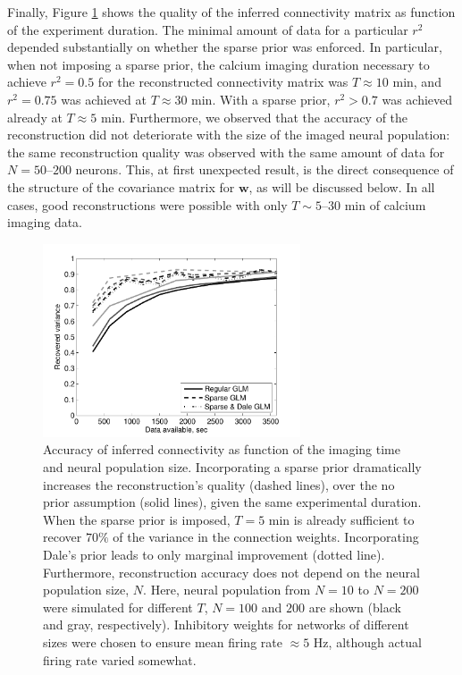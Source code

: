 \documentclass[aoas,preprint]{imsart}
\newcommand{\w}{w}
\newcommand{\bw}{\mathbf{\w}}
\begin{document}
Finally, Figure \ref{fig:recvar-NT} shows the quality of the inferred connectivity matrix as function of the experiment duration. The minimal amount of data for a particular $r^2$ depended substantially on whether the sparse prior was enforced. In particular, when not imposing a sparse prior, the calcium imaging duration necessary to achieve $r^2=0.5$ for the reconstructed connectivity matrix was $T\approx 10$ min, and $r^2=0.75$ was achieved at $T\approx 30$ min. With a sparse prior, $r^2>0.7$ was achieved already at $T\approx 5$ min. Furthermore, we observed that the accuracy of the reconstruction did not deteriorate with the size of the imaged neural population: the same reconstruction quality was observed with the same amount of data for $N=50$--$200$ neurons.  This, at first unexpected result, is the direct consequence of the structure of the covariance matrix for $\bw$, as will be discussed below. In all cases, good reconstructions were possible with only $T\sim 5$--$30$ min of calcium imaging data.

\begin{figure}[h]
\centering
\includegraphics[width=3in]{../figs/FigureA7_recvar_NT}
\caption{Accuracy of inferred connectivity as function of the imaging time and neural population size. Incorporating a sparse prior dramatically increases the reconstruction's quality (dashed lines), over the no prior assumption (solid lines), given the same experimental duration. When the sparse prior is imposed, $T=5$ min is already sufficient to recover $70\%$ of the variance in the connection weights. Incorporating Dale's prior leads to only marginal improvement (dotted line). Furthermore, reconstruction accuracy does not depend on the neural population size, $N$. Here, neural population from $N=10$ to $N=200$ were simulated for different $T$, $N=100$ and $200$ are shown (black and gray, respectively).  Inhibitory weights for networks of different sizes were chosen to ensure mean firing rate $\approx 5$ Hz, although actual firing rate varied somewhat.}
\label{fig:recvar-NT}
\end{figure}
\end{document}
